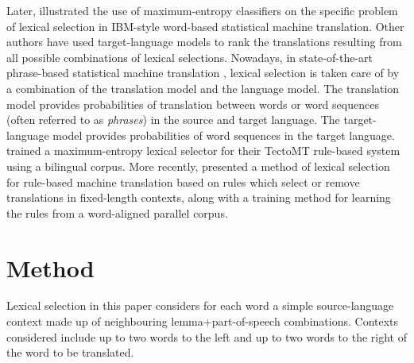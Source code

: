 \documentclass[11pt]{article}
\newcommand{\comment}[1]{\todo{#1}}
\begin{document}
Later, \cite{berger1996} illustrated the use of maximum-entropy
classifiers on the specific problem of lexical selection in IBM-style
word-based statistical machine translation. Other authors
\citep{melero07a} have used target-language models to
rank %
the translations resulting from all possible combinations of lexical
selections. Nowadays, in state-of-the-art phrase-based
statistical %
machine translation \citep{koehn2009statistical}, lexical selection is
taken care of by a combination of the translation model and the
language model. The translation model provides probabilities of
translation between words or word sequences (often referred to as
\emph{phrases}) in the source and target language. The target-language
model provides probabilities of word sequences in the target language.
\cite{marechek10} trained a maximum-entropy lexical selector for their
TectoMT rule-based system using a bilingual corpus.  More recently,
\cite{tyers12a} presented a method of lexical selection for rule-based
machine translation based on rules which select or remove translations
in fixed-length contexts, along with a training method for learning
the rules from a word-aligned parallel corpus.



\section{Method}


Lexical selection in this paper considers for
each word a simple source-language context made up of neighbouring
lemma+part-of-speech combinations. Contexts considered include up to
two words to the left and up to two words to the right of the word to
be translated. 
\end{document}
